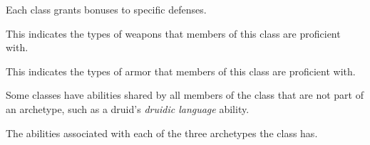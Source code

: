     Each class grants bonuses to specific defenses.

    This indicates the types of weapons that members of this class are proficient with.

    This indicates the types of armor that members of this class are proficient with.

    Some classes have abilities shared by all members of the class that are not part of an archetype, such as a druid's \textit{druidic language} ability.

    The abilities associated with each of the three archetypes the class has.


